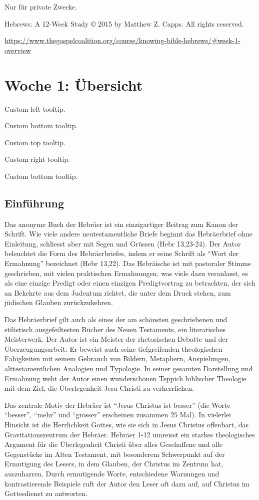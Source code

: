 \documentclass[]{book}
\begin{document}
Nur für private Zwecke.

Hebrews: A 12-Week Study © 2015 by Matthew Z. Capps. All rights
reserved.

\url{https://www.thegospelcoalition.org/course/knowing-bible-hebrews/\#week-1-overview}

\hypertarget{woche01}{\chapter{Woche 1: Übersicht}\label{woche01}}

{Custom left tooltip.}

{Custom bottom tooltip.}

{Custom top tooltip.}

{Custom right tooltip.}

Custom bottom tooltip.

\section{Einführung}\label{einfuxfchrung}

Das anonyme Buch der Hebräer ist ein einzigartiger Beitrag zum Kanon der
Schrift. Wie viele andere neutestamentliche Briefe beginnt das
Hebräerbrief ohne Einleitung, schliesst aber mit Segen und Grüssen (Hebr
13,23-24). Der Autor beleuchtet die Form des Hebräerbriefes, indem er
seine Schrift als ``Wort der Ermahnung'' bezeichnet (Hebr 13,22). Das
Hebräische ist mit pastoraler Stimme geschrieben, mit vielen praktischen
Ermahnungen, was viele dazu veranlasst, es als eine einzige Predigt oder
einen einzigen Predigtvortrag zu betrachten, der sich an Bekehrte aus
dem Judentum richtet, die unter dem Druck stehen, zum jüdischen Glauben
zurückzukehren.

Das Hebräerbrief gilt auch als eines der am schönsten geschriebenen und
stilistisch ausgefeiltesten Bücher des Neuen Testaments, ein
literarisches Meisterwerk. Der Autor ist ein Meister der rhetorischen
Debatte und der Überzeugungsarbeit. Er beweist auch seine tiefgreifenden
theologischen Fähigkeiten mit seinem Gebrauch von Bildern, Metaphern,
Anspielungen, alttestamentlichen Analogien und Typologie. In seiner
gesamten Darstellung und Ermahnung webt der Autor einen wunderschönen
Teppich biblischer Theologie mit dem Ziel, die Überlegenheit Jesu
Christi zu verherrlichen.

Das zentrale Motiv der Hebräer ist ``Jesus Christus ist besser'' (die
Worte ``besser'', ``mehr'' und ``grösser'' erscheinen zusammen 25 Mal).
In vielerlei Hinsicht ist die Herrlichkeit Gottes, wie sie sich in Jesus
Christus offenbart, das Gravitationszentrum der Hebräer. Hebräer 1-12
umreisst ein starkes theologisches Argument für die Überlegenheit
Christi über alles Geschaffene und alle Gegenstücke im Alten Testament,
mit besonderem Schwerpunkt auf der Ermutigung des Lesers, in dem
Glauben, der Christus im Zentrum hat, auszuharren. Durch ermutigende
Worte, entschiedene Warnungen und kontrastierende Beispiele ruft der
Autor den Leser oft dazu auf, auf Christus im Gottesdienst zu antworten.
\end{document}
